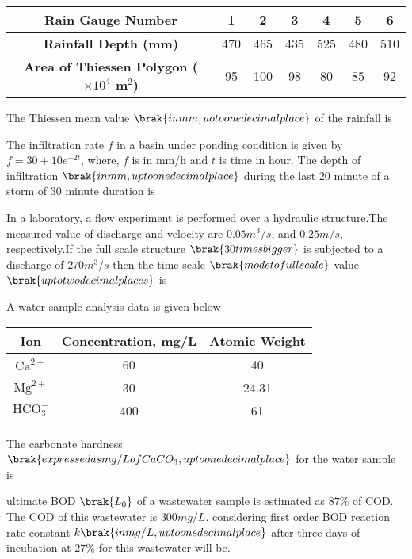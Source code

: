 \begin{table}[h!]
\centering
\begin{tabular}{|c|c|c|c|c|c|c|}
\hline
\textbf{Rain Gauge Number} & 1 & 2 & 3 & 4 & 5 & 6 \\
\hline
\textbf{Rainfall Depth (mm)} & 470 & 465 & 435 & 525 & 480 & 510 \\
\hline
\textbf{Area of Thiessen Polygon ($\times 10^4$ m$^2$)} & 95 & 100 & 98 & 80 & 85 & 92 \\
\hline
\end{tabular}
\end{table}
The Thiessen mean value $\brak{in mm, uo to one decimal place}$ of the rainfall is\\
\item The infiltration rate $f$ in a basin under ponding condition is given by $f=30+10e^{-2t}$,
where, $f$ is in mm/h and $t$ is time in hour. The depth of infiltration $\brak{in mm, up to one decimal place}$ during the last $20$ minute of a storm of $30$ minute duration is\\
\item In a laboratory, a flow experiment is performed over a hydraulic structure.The measured value of discharge and velocity are  $0.05 m^{3}/s$, and $0.25 m/s$, respectively.If the full scale structure $\brak{30 times bigger}$ is subjected to a discharge of $270 m^{3}/s$ then the time scale $\brak{mode to full scale}$ value $\brak{up to two decimal places}$ is\\
\item A water sample analysis data is given below\\
\begin{table}[h!]
    \centering
    \begin{tabular}{|c|c|c|}
        \hline
        \textbf{Ion} & \textbf{Concentration, mg/L} & \textbf{Atomic Weight} \\
        \hline
        $\text{Ca}^{2+}$ & 60 & 40 \\
        \hline
        $\text{Mg}^{2+}$ & 30 & 24.31 \\
        \hline
        $\text{HCO}_{3}^{-}$ & 400 & 61 \\
        \hline
    \end{tabular}
\end{table}
The carbonate hardness $\brak{expressed as mg/L of CaCO_{3}, up to one decimal place}$ for the water sample is\\
\item ultimate BOD $\brak{L_{0}}$ of a wastewater sample is estimated as $87\%$ of COD. The COD of this wastewater is $300 mg/L$. considering first order BOD reaction rate constant $k \brak{in mg/L, up to one decimal place}$ after three days of incubation at $27\%$ for this wastewater will be.









 
 

